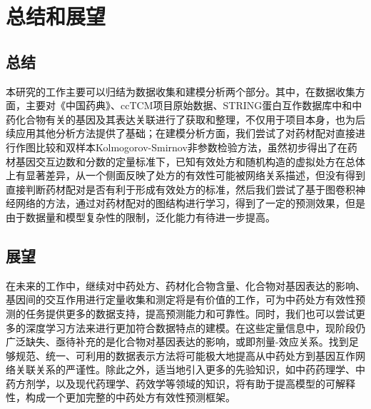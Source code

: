 
\chapter{总结和展望}

\section{总结}

本研究的工作主要可以归结为数据收集和建模分析两个部分。其中，在数据收集方面，主要对《中国药典》、ccTCM项目原始数据、STRING蛋白互作数据库中和中药化合物有关的基因及其表达关联进行了获取和整理，不仅用于项目本身，也为后续应用其他分析方法提供了基础；在建模分析方面，我们尝试了对药材配对直接进行作图比较和双样本Kolmogorov-Smirnov非参数检验方法，虽然初步得出了在药材基因交互边数和分数的定量标准下，已知有效处方和随机构造的虚拟处方在总体上有显著差异，从一个侧面反映了处方的有效性可能被网络关系描述，但没有得到直接判断药材配对是否有利于形成有效处方的标准，然后我们尝试了基于图卷积神经网络的方法，通过对药材配对的图结构进行学习，得到了一定的预测效果，但是由于数据量和模型复杂性的限制，泛化能力有待进一步提高。

\section{展望}

在未来的工作中，继续对中药处方、药材化合物含量、化合物对基因表达的影响、基因间的交互作用进行定量收集和测定将是有价值的工作，可为中药处方有效性预测的任务提供更多的数据支持，提高预测能力和可靠性。同时，我们也可以尝试更多的深度学习方法来进行更加符合数据特点的建模。在这些定量信息中，现阶段仍广泛缺失、亟待补充的是化合物对基因表达的影响，或即剂量-效应关系。找到足够规范、统一、可利用的数据表示方法将可能极大地提高从中药处方到基因互作网络关联关系的严谨性。除此之外，适当地引入更多的先验知识，如中药药理学、中药方剂学，以及现代药理学、药效学等领域的知识，将有助于提高模型的可解释性，构成一个更加完整的中药处方有效性预测框架。